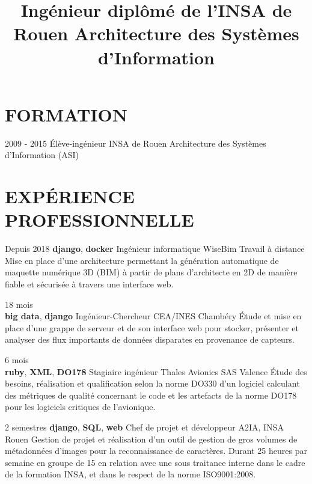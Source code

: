 \documentclass[11pt,a4paper]{moderncv}
\title{
  Ingénieur diplômé de l'INSA de Rouen \newline{}
  Architecture des Systèmes d'Information
}
\begin{document}
  \maketitle

  \section{FORMATION}



  \cventry
    {2009 - 2015}
    {Élève-ingénieur}
    {INSA de Rouen}
    {Architecture des Systèmes d'Information (ASI)}
    {}{}

  \section{EXPÉRIENCE PROFESSIONNELLE}

  \cventry
    {Depuis 2018 \textbf{django}, \textbf{docker}}
    {Ingénieur informatique}
    {WiseBim}
    {Travail à distance}
    {}{
      Mise en place d'une architecture permettant la génération automatique de
      maquette numérique 3D (BIM) à partir de plans d'architecte en 2D de
      manière fiable et sécurisée à travers une interface web.
    }

  \cventry
    {18 mois \\ \textbf{big data}, \textbf{django}}
    {Ingénieur-Chercheur}
    {CEA/INES}
    {Chambéry}
    {}{
      Étude et mise en place d'une grappe de serveur et de son interface web
      pour stocker, présenter et analyser des flux importants de données
      disparates en provenance de capteurs.
    }

  \cventry
    {6 mois \\ \textbf{ruby}, \textbf{XML}, \textbf{DO178}}
    {Stagiaire ingénieur}
    {Thales Avionics SAS}
    {Valence}
    {}{
      Étude des besoins, réalisation et qualification selon la norme DO330
      d'un logiciel calculant des métriques de qualité concernant le code et
      les artefacts de la norme DO178 pour les logiciels critiques de
      l'avionique.
    }

  \cventry
    {2 semestres \textbf{django}, \textbf{SQL}, \textbf{web}}
    {Chef de projet et développeur}
    {A2IA, INSA}
    {Rouen}
    {}{
      Gestion de projet et réalisation d'un outil de gestion de gros volumes de
      métadonnées d'images pour la reconnaissance de caractères. Durant 25
      heures par semaine en groupe de 15 en relation avec une sous traitance
      interne dans le cadre de la formation INSA, et dans le respect de la
      norme ISO9001:2008.
    }
\end{document}
